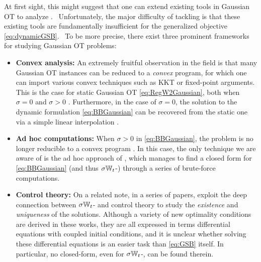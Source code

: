 At first sight, this might suggest that one can extend existing tools in Gaussian \acrshort{OT} to analyze .%
~Unfortunately, the major difficulty of tackling  is that these existing tools are fundamentally insufficient for the generalized objective \eqref{eq:dynamicGSB}. 
~To be more precise, there exist three prominent frameworks for studying Gaussian \acrshort{OT} problems:%
\begin{itemize}[leftmargin=.4cm,itemsep=.0cm,topsep=.0cm]
\item \textbf{Convex analysis:} An extremely fruitful observation in the field is that many Gaussian \acrshort{OT} instances can be reduced to a \emph{convex} program, for which one can import various convex techniques such as KKT or fixed-point arguments. This is the case for static Gaussian \acrshort{OT} \eqref{eq:RegW2Gaussian}, both when $\sigma = 0$ \citep{dowson1982frechet, olkin1982distance, bhatia2019bures} and $\sigma>0$ \citep{janati2020entropic}. Furthermore, in the case of $\sigma=0$, the solution to the dynamic formulation \eqref{eq:BBGaussian} can be recovered from the static one via a simple linear interpolation \citep{mccann1997convexity}.

\item \textbf{Ad hoc computations:} When $\sigma>0$ in \eqref{eq:BBGaussian}, the problem is no longer reducible to a convex program \citep{leonard2013survey, chen2021stochastic}. In this case, the only technique we are aware of is the ad hoc approach of \citep{mallasto2021entropy}, which manages to find a closed form for \eqref{eq:BBGaussian} (and thus $\sigma\mathbb{W}_{t}$-) through a series of brute-force computations.

\item \textbf{Control theory:} On a related note, in a series of papers, \citet{chen2015optimal,chen2016relation,chen2018optimal} exploit the deep connection between $\sigma\mathbb{W}_{t}$- and control theory to study the \emph{existence} and \emph{uniqueness} of the solutions. Although a variety of new optimality conditions are derived in these works, they are all expressed in terms differential equations with coupled initial conditions, and it is unclear whether solving these differential equations is an easier task than \eqref{eq:GSB} itself. In particular, no closed-form, even for $\sigma\mathbb{W}_{t}$-, can be found therein.
\end{itemize}

